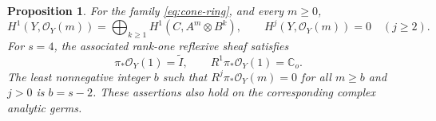 \documentclass[11pt,reqno]{amsart}
\numberwithin{equation}{section}
\newtheorem{proposition}[theorem]{Proposition}
\theoremstyle{definition}
\theoremstyle{remark}
\newcommand{\OO}{\mathcal O}
\newcommand{\CC}{\mathbb C}
\begin{document}
\begin{proposition}\label{prop:normal-example}
For the family \eqref{eq:cone-ring}, and every $m\geq0$,
\begin{equation}\label{eq:normalexample}
 H^1(Y,\OO_Y(m))=\bigoplus_{k\geq1}H^1(C,A^m\otimes B^k),
 \qquad H^j(Y,\OO_Y(m))=0\quad(j\geq2).
\end{equation}
For $s=4$, the associated rank-one reflexive sheaf satisfies
\begin{equation}\label{eq:normal-counterexample}
 \pi_*\OO_Y(1)=\widetilde I,\qquad R^1\pi_*\OO_Y(1)=\CC_o.
\end{equation}
The least nonnegative integer $b$ such that $R^j\pi_*\OO_Y(m)=0$ for all $m\geq b$ and $j>0$ is $b=s-2$. These assertions also hold on the corresponding complex analytic germs.
\end{proposition}
\end{document}
